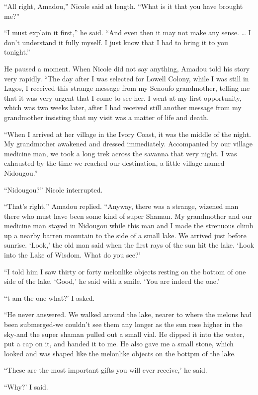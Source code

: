 \documentclass[]{article}
\begin{document}
{{“All right, Amadou,” Nicole said at length. “What is it that you have brought me?”

“I must explain it first,” he said. “And even then it may not make any sense. … I don’t understand it fully myself. I just know that I had to bring it to you tonight.”

He paused a moment. When Nicole did not say anything, Amadou told his story very rapidly. “The day after I was selected for Lowell Colony, while I was still in Lagos, I received this strange message from my Senoufo grandmother, telling me that it was very urgent that I come to see her. I went at my first opportunity, which was two weeks later, after I had received still another message from my grandmother insisting that my visit was a matter of life and death.

“When I arrived at her village in the Ivory Coast, it was the middle of the night. My grandmother awakened and dressed immediately. Accompanied by our village medicine man, we took a long trek across the savanna that very night. I was exhausted by the time we reached our destination, a little village named Nidougou.”

“Nidougou?” Nicole interrupted.

“That’s right,” Amadou replied. “Anyway, there was a strange, wizened man there who must have been some kind of super Shaman. My grandmother and our medicine man stayed in Nidougou while this man and I made the strenuous climb up a nearby barren mountain to the side of a small lake. We arrived just before sunrise. ‘Look,’ the old man said when the first rays of the sun hit the lake. ‘Look into the Lake of Wisdom. What do you see?’

“I told him I saw thirty or forty melonlike objects resting on the bottom of one side of the lake. ‘Good,’ he said with a smile. ‘You are indeed the one.’

“t am the one what?’ I asked.

“He never answered. We walked around the lake, nearer to where the melons had been submerged-we couldn’t see them any longer as the sun rose higher in the sky-and the super shaman pulled out a small vial. He dipped it into the water, put a cap on it, and handed it to me. He also gave me a small stone, which looked and was shaped like the melonlike objects on the bottpm of the lake.

“These are the most important gifts you will ever receive,’ he said.

“Why?’ I said.

}}
\end{document}
